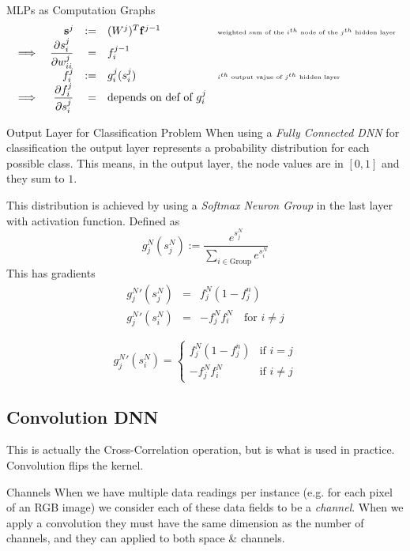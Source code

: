 \documentclass[11pt,a4paper]{article}
\begin{document}
  \begin{proposition}{MLPs as Computation Graphs}
    \[\begin{array}{rrrll}
      &\mathbf{s}^j&:=&(W^j)^T\mathbf{f}^{j-1}&\tiny\text{weighted sum of the $i^{th}$ node of the $j^{th}$ hidden layer}\\
      \implies&\dfrac{\partial s_i^j}{\partial w_{ii}^j}&=&f_i^{j-1}\\
      &f_i^j&:=&g_i^j(s_i^j)&\tiny\text{$i^{th}$ output vajue of $j^{th}$ hidden layer}\\
      \implies&\dfrac{\partial f_i^j}{\partial s_i^j}&=&\text{depends on def of }g_i^j
    \end{array}\]
  \end{proposition}

  \begin{proposition}{Output Layer for Classification Problem}
    When using a \textit{Fully Connected DNN} for classification the output layer represents a probability distribution for each possible class. This means, in the output layer, the node values are in $[0,1]$ and they sum to $1$.
    \par This distribution is achieved by using a \textit{Softmax Neuron Group} in the last layer with activation function. Defined as
    \[  g_j^N(s_j^N):=\frac{e^{s_j^N}}{\displaystyle\sum_{i\in\text{Group}}e^{s_i^N}} \]
    This has gradients
    \[\begin{array}{rcl}
      {g_j^N}'(s_j^N)&=&f_j^N(1-f_j^n)\\
      {g_j^N}'(s_{i}^N)&=&-f_j^Nf_i^N\quad\text{for }i\neq j
    \end{array}\]

    \[ {g_j^N}'(s_i^N)=\begin{cases}f_j^N(1-f_j^n)&\text{if }i=j\\-f_j^Nf_i^N&\text{if }i\neq j\end{cases} \]
  \end{proposition}

\subsection{Convolution DNN} \label{sec_CNN}

  \begin{remark}{This is actually the Cross-Correlation operation, but is what is used in practice.}
    Convolution flips the kernel.
  \end{remark}

  \begin{definition}{Channels}
    When we have multiple data readings per instance (e.g. for each pixel of an RGB image) we consider each of these data fields to be a \textit{channel}. When we apply a convolution they must have the same dimension as the number of channels, and they can applied to both space \& channels.
  \end{definition}
\end{document}
